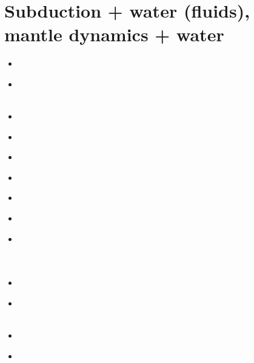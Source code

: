 \section{Subduction + water (fluids), mantle dynamics + water}

\begin{scriptsize}
\begin{itemize}
\item[\nineteeneightyseven]
\textcite{peac87a} \\
\item[\nineteenninety]
\textcite{peac90a} \\
\textcite{peac90b} \\
\item[\nineteenninetyone]
\textcite{peac91} \\
\item[\nineteenninetyeight]
\textcite{scpo98} \\
\item[\twothousandtwo] 
\textcite{vakp02} \\
\item[\twothousandfour] 
\textcite{didb04} \\
\item[\twothousandfive] 
\textcite{artd05} \\
\item[\twothousandsix] 
\textcite{abvk06} \\
\item[\twothousandeight] 
\textcite{vary08} \\
\textcite{wawh08} \\
\textcite{arld08} \\
\item[\twothousandten] 
\textcite{roms10} \\
\item[\twothousandeleven] 
\textcite{geme11} \\
\textcite{vahs11} \\
\item[\twothousandtwelve] 
\textcite{fagm12} \\
\item[\twothousandfourteen] 

\end{itemize}
\end{scriptsize}
